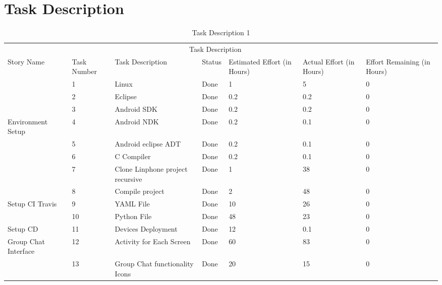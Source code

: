 \documentclass[a4paper]{article}
\begin{document}
\section{Task Description}
\begin{table}[H] 
\begin{tabular}{p{3cm} p{1cm} p{3.5cm} p{1cm} p{1cm} p{1cm} p{1cm}} 
\hline %
& \multicolumn{5}{c}{Task Description} \\
\cmidrule(l){2-7}
Story Name & Task Number & Task Description & Status & Estimated Effort (in Hours) & Actual Effort (in Hours) & Effort Remaining (in Hours)\\ %
\hline

 & 1 & Linux & Done & 1 & 5 & 0\\ \cmidrule(l){2-6}

 & 2 & Eclipse & Done & 0.2 & 0.2 & 0\\ \cmidrule(l){2-6}

 & 3 & Android SDK & Done & 0.2  & 0.2 & 0\\ \cmidrule(l){2-6}
 
 Environment Setup & 4 & Android NDK & Done & 0.2 & 0.1 & 0\\ \cmidrule(l){2-6}

 & 5 & Android eclipse ADT & Done & 0.2 & 0.1 & 0\\ \cmidrule(l){2-6}

 & 6 & C Compiler & Done & 0.2 & 0.1 & 0\\ \cmidrule(l){2-6}
 
 & 7 & Clone Linphone project recursive & Done & 1 & 38 & 0\\ \cmidrule(l){2-6}

 & 8 &  Compile project  & Done & 2 & 48 & 0\\  
\midrule %

 Setup CI Travis & 9 & YAML File & Done & 10 & 26 & 0\\ \cmidrule(l){2-6}

 & 10 & Python File & Done & 48 & 23 & 0\\  
\midrule %

Setup CD & 11 & Devices Deployment & Done & 12 & 0.1 & 0\\
\midrule

Group Chat Interface & 12 & Activity for Each Screen & Done & 60 & 83 & 0\\ \cmidrule(l){2-6}

& 13 & Group Chat functionality Icons & Done & 20 & 15 & 0\\ 
\hline
\end{tabular}
\caption{Task Description 1} %
\label{tab:template} %
\end{table}
\end{document}
